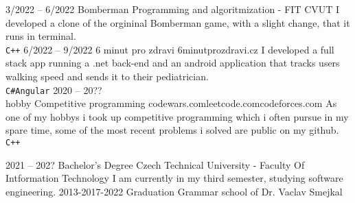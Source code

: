 \documentclass[9pt]{developercv} %
\begin{document}
\begin{entrylist}
	\entry
		{3/2022 -- 6/2022}
		{Bomberman}
		{Programming and algoritmization - FIT CVUT}
		{I developed a clone of the orgininal Bomberman game, with a slight change, that it runs in terminal.\\ \texttt{C++}}
	\entry
		{6/2022 -- 9/2022}
		{6 minut pro zdravi}
		{6minutprozdravi.cz}
		{I developed a full stack app running a .net back-end and an android application that tracks users walking speed and sends it to their pediatrician.\\ \texttt{C\#}\slashsep\texttt{Angular}}
	\entry
		{2020 -- 20??\\\footnotesize{hobby}}
		{Competitive programming}
		{codewars.com\slashsep leetcode.com\slashsep codeforces.com}
		{As one of my hobbys i took up competitive programming which i often pursue in my spare time, some of the most recent problems i solved are public on my github. \\ \texttt{C++}}
\end{entrylist}



\begin{entrylist}
	\entry
		{2021 -- 202?}
		{Bachelor's Degree}
		{Czech Technical University - Faculty Of Intformation Technology}
		{I am currently in my third semester, studying software engineering.}
	\entry
		{2013-2017-2022}
		{Graduation}
		{Grammar school of Dr. Vaclav Smejkal}
		{}
\end{entrylist}

\end{document}
